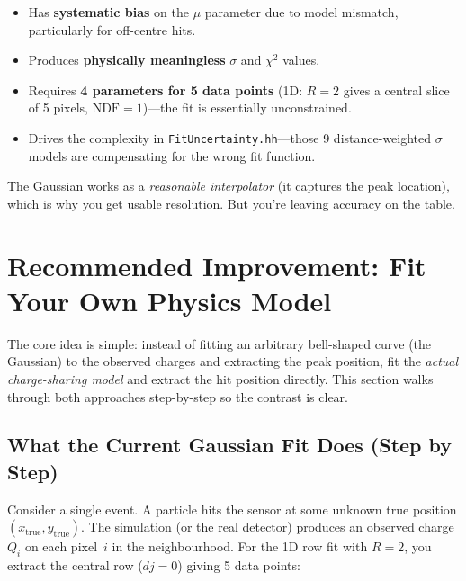 \documentclass[11pt,a4paper]{article}
\newcommand{\file}[1]{\texttt{#1}}
\begin{document}
\begin{itemize}[nosep]
  \item Has \textbf{systematic bias} on the $\mu$ parameter due to model
    mismatch, particularly for off-centre hits.
  \item Produces \textbf{physically meaningless} $\sigma$ and $\chi^{2}$
    values.
  \item Requires \textbf{4 parameters for 5 data points} (1D: $R=2$ gives
    a central slice of 5 pixels, $\text{NDF}=1$)---the fit is essentially
    unconstrained.
  \item Drives the complexity in \file{FitUncertainty.hh}---those 9
    distance-weighted $\sigma$ models are compensating for the wrong fit
    function.
\end{itemize}

\noindent
The Gaussian works as a \emph{reasonable interpolator} (it captures the
peak location), which is why you get usable resolution.  But you're
leaving accuracy on the table.

\section{Recommended Improvement: Fit Your Own Physics Model}
\label{sec:physfit}

The core idea is simple: instead of fitting an arbitrary bell-shaped
curve (the Gaussian) to the observed charges and extracting the peak
position, fit the \emph{actual charge-sharing model} and extract the
hit position directly.  This section walks through both approaches
step-by-step so the contrast is clear.

\subsection{What the Current Gaussian Fit Does (Step by Step)}
\label{sec:current-fit}

Consider a single event.  A particle hits the sensor at some unknown true
position $(x_{\text{true}}, y_{\text{true}})$.  The simulation (or the
real detector) produces an observed charge $Q_i$ on each pixel~$i$ in
the neighbourhood.  For the 1D row fit with $R=2$, you extract the
central row ($dj = 0$) giving 5 data points:
\end{document}
